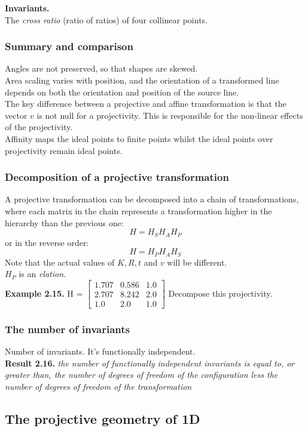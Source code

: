 \documentclass[12pt]{article}
\begin{document}
\noindent \textbf{Invariants.} \\
The \textit{cross ratio} (ratio of ratios) of four collinear points.

\subsubsection{Summary and comparison}
Angles are not preserved, so that shapes are skewed. \\
Area scaling varies with position, and the orientation of a transformed line depends on both the 
orientation and position of the source line. \\
The key difference between a projective and affine transformation is that the vector 
$v$ is not null for a projectivity. This is responsible for the non-linear effects of the projectivity. \\
Affinity maps the ideal points to finite points whilst the ideal points over projectivity remain ideal points. 

\subsubsection{Decomposition of a projective transformation}
A projective transformation can be decomposed into a chain of transformations, where each matrix in the chain 
represents a transformation higher in the hierarchy than the previous one: 
$$ H = H_S H_A H_P $$ 
or in the reverse order:
$$ H = H_P H_A H_S $$
Note that the actual values of $K, R, t$ and $v$ will be different. \\
$H_P$ is an \textit{elation}. \\

\noindent \textbf{Example 2.15.} 
H = 
$\begin{bmatrix}
    1.707 & 0.586 & 1.0 \\
    2.707 & 8.242 & 2.0 \\
    1.0   & 2.0   & 1.0
\end{bmatrix}$
Decompose this projectivity. 

\subsubsection{The number of invariants}
Number of invariants. It's functionally independent. \\

\noindent \textbf{Result 2.16.} \textit{the number of functionally independent invariants is equal to, 
or greater than, the number of degrees of freedom of the configuration 
less the number of degrees of freedom of the transformation}

\subsection{The projective geometry of 1D}
\end{document}

